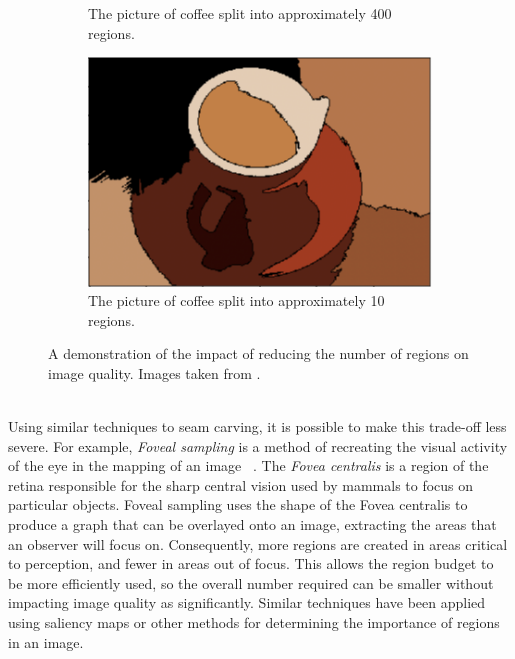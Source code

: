 \begin{figure}[h!]
\begin{subfigure}[t]{0.29\textwidth}
        \caption{The picture of coffee split into approximately 400 regions.}
    \end{subfigure} \hfill%
    \begin{subfigure}[t]{0.29\textwidth}
        \centering
        \captionsetup{justification=centering}
        \includegraphics[scale=0.34]{figures/adjacencyAfter}
        \caption{The picture of coffee split into approximately 10 regions.}
    \end{subfigure}%
    \caption[Tuning Region Adjacency Graphs]{A demonstration of the impact of reducing the number of regions on image quality. Images taken from \cite{Foveal}.}
    \label{fig:regions}
\end{figure}
\smallskip \\ \indent
Using similar techniques to seam carving, it is possible to make this trade-off less severe. For example, \textit{Foveal sampling} is a method of recreating the visual activity of the eye in the mapping of an image ~\cite{Foveal}. The \textit{Fovea centralis} is a region of the retina responsible for the sharp central vision used by mammals to focus on particular objects. Foveal sampling uses the shape of the Fovea centralis to produce a graph that can be overlayed onto an image, extracting the areas that an observer will focus on. Consequently, more regions are created in areas critical to perception, and fewer in areas out of focus. This allows the region budget to be more efficiently used, so the overall number required can be smaller without impacting image quality as significantly. Similar techniques have been applied using saliency maps or other methods for determining the importance of regions in an image.
